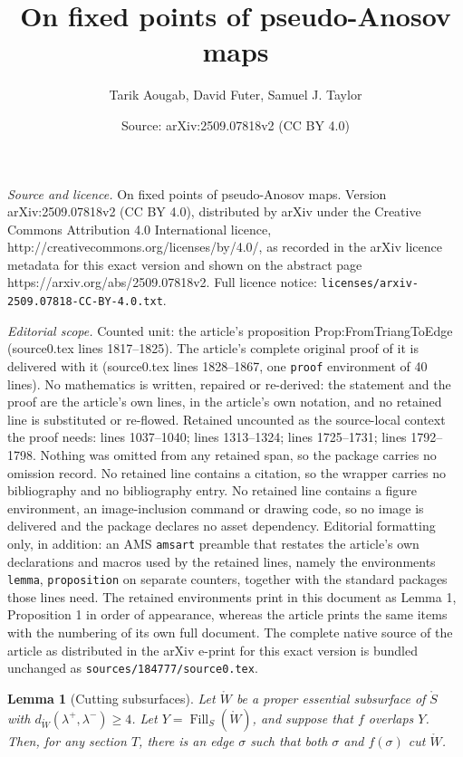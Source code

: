 \documentclass[10pt,a4paper]{amsart}
\title{On fixed points of pseudo-Anosov maps}
\author{Tarik Aougab, David Futer, Samuel J. Taylor}
\date{Source: arXiv:2509.07818v2 (CC BY 4.0)}
\newtheorem{lemma}{Lemma}
\newcommand{\Fill}{\operatorname{Fill}}
\newcommand{\mr}{\mathring}
\newcommand{\psub}{\mr W}
\begin{document}
\maketitle

\noindent\emph{Source and licence.} On fixed points of pseudo-Anosov maps. Version arXiv:2509.07818v2 (CC BY 4.0), distributed by arXiv under the Creative Commons Attribution 4.0 International licence, http://creativecommons.org/licenses/by/4.0/, as recorded in the arXiv licence metadata for this exact version and shown on the abstract page https://arxiv.org/abs/2509.07818v2. Full licence notice: \texttt{licenses/arxiv-2509.07818-CC-BY-4.0.txt}.\par\smallskip

\noindent\textit{Editorial scope.} Counted unit: the article's proposition Prop:FromTriangToEdge (source0.tex lines 1817--1825). The article's complete original proof of it is delivered with it (source0.tex lines 1828--1867, one \texttt{proof} environment of 40 lines). No mathematics is written, repaired or re-derived: the statement and the proof are the article's own lines, in the article's own notation, and no retained line is substituted or re-flowed.  Retained uncounted as the source-local context the proof needs: lines 1037--1040; lines 1313--1324; lines 1725--1731; lines 1792--1798.  Nothing was omitted from any retained span, so the package carries no omission record.  No retained line contains a citation, so the wrapper carries no bibliography and no bibliography entry.  No retained line contains a figure environment, an image-inclusion command or drawing code, so no image is delivered and the package declares no asset dependency.  Editorial formatting only, in addition: an AMS \texttt{amsart} preamble that restates the article's own declarations and macros used by the retained lines, namely the environments \texttt{lemma}, \texttt{proposition} on separate counters, together with the standard packages those lines need.  The retained environments print in this document as Lemma 1, Proposition 1 in order of appearance, whereas the article prints the same items with the numbering of its own full document.  The complete native source of the article as distributed in the arXiv e-print for this exact version is bundled unchanged as \texttt{sources/184777/source0.tex}.
\begin{lemma}[Cutting subsurfaces]\label{Lem:CuttingSubsurfaces}
Let $\psub$ be a proper essential subsurface of $\mr S$ with $d_{\psub} (\lambda^+, \lambda^-) \geq 4$. 
Let $Y = \Fill_S(\psub)$, and suppose that $f$ overlaps $Y$. Then, for any section $T$, there is an edge $\sigma$ such that both $\sigma$ and $f(\sigma)$ cut $\psub$. 
\end{lemma}
\end{document}
